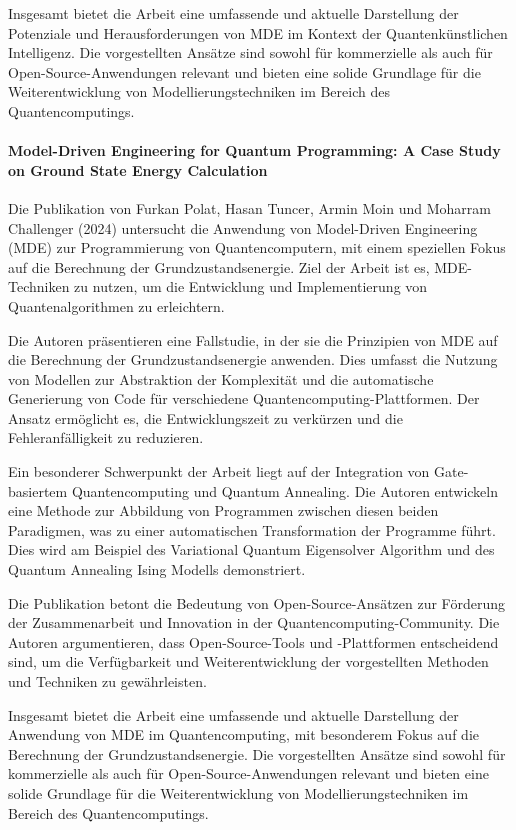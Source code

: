 Insgesamt bietet die Arbeit eine umfassende und aktuelle Darstellung der Potenziale und Herausforderungen von MDE im 
Kontext der Quantenkünstlichen Intelligenz. Die vorgestellten Ansätze sind sowohl für kommerzielle als auch für 
Open-Source-Anwendungen relevant und bieten eine solide Grundlage für die Weiterentwicklung von Modellierungstechniken 
im Bereich des Quantencomputings.

\paragraph{Model-Driven Engineering for Quantum Programming: A Case Study on Ground State Energy Calculation}

Die Publikation von Furkan Polat, Hasan Tuncer, Armin Moin und Moharram Challenger (2024) untersucht die Anwendung 
von Model-Driven Engineering (MDE) zur Programmierung von Quantencomputern, mit einem speziellen Fokus auf die 
Berechnung der Grundzustandsenergie. Ziel der Arbeit ist es, MDE-Techniken zu nutzen, um die Entwicklung und 
Implementierung von Quantenalgorithmen zu erleichtern.

Die Autoren präsentieren eine Fallstudie, in der sie die Prinzipien von MDE auf die Berechnung der Grundzustandsenergie 
anwenden. Dies umfasst die Nutzung von Modellen zur Abstraktion der Komplexität und die automatische Generierung von 
Code für verschiedene Quantencomputing-Plattformen. Der Ansatz ermöglicht es, die Entwicklungszeit zu verkürzen und 
die Fehleranfälligkeit zu reduzieren.

Ein besonderer Schwerpunkt der Arbeit liegt auf der Integration von Gate-basiertem Quantencomputing und Quantum 
Annealing. Die Autoren entwickeln eine Methode zur Abbildung von Programmen zwischen diesen beiden Paradigmen, was 
zu einer automatischen Transformation der Programme führt. Dies wird am Beispiel des Variational Quantum Eigensolver 
Algorithm und des Quantum Annealing Ising Modells demonstriert.

Die Publikation betont die Bedeutung von Open-Source-Ansätzen zur Förderung der Zusammenarbeit und Innovation in der 
Quantencomputing-Community. Die Autoren argumentieren, dass Open-Source-Tools und -Plattformen entscheidend sind, um 
die Verfügbarkeit und Weiterentwicklung der vorgestellten Methoden und Techniken zu gewährleisten.

Insgesamt bietet die Arbeit eine umfassende und aktuelle Darstellung der Anwendung von MDE im Quantencomputing, mit 
besonderem Fokus auf die Berechnung der Grundzustandsenergie. Die vorgestellten Ansätze sind sowohl für kommerzielle 
als auch für Open-Source-Anwendungen relevant und bieten eine solide Grundlage für die Weiterentwicklung von 
Modellierungstechniken im Bereich des Quantencomputings.

